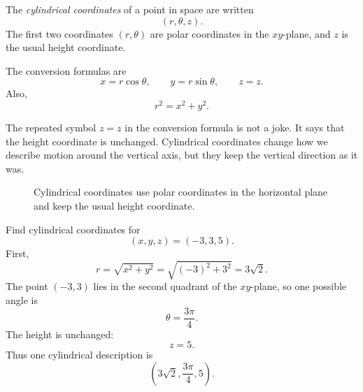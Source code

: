 \begin{definition}
The \emph{cylindrical coordinates} of a point in space are written
\[
    (r,\theta,z).
\]
The first two coordinates \((r,\theta)\) are polar coordinates in the \(xy\)-plane, and
\(z\) is the usual height coordinate.

The conversion formulas are
\[
\boxed{
    x=r\cos\theta,\qquad y=r\sin\theta,\qquad z=z.
}
\]
Also,
\[
\boxed{
    r^2=x^2+y^2.
}
\]
\end{definition}

The repeated symbol \(z=z\) in the conversion formula is not a joke.  It says that the
height coordinate is unchanged.  Cylindrical coordinates change how we describe motion
around the vertical axis, but they keep the vertical direction as it was.

\begin{figure}[h]
\centering
{}
\caption{Cylindrical coordinates use polar coordinates in the horizontal plane and keep
the usual height coordinate.}
\end{figure}

\begin{example}
Find cylindrical coordinates for
\[
    (x,y,z)=(-3,3,5).
\]
First,
\[
    r=\sqrt{x^2+y^2}=\sqrt{(-3)^2+3^2}=3\sqrt2.
\]
The point \((-3,3)\) lies in the second quadrant of the \(xy\)-plane, so one possible
angle is
\[
    \theta=\frac{3\pi}{4}.
\]
The height is unchanged:
\[
    z=5.
\]
Thus one cylindrical description is
\[
    \left(3\sqrt2,\frac{3\pi}{4},5\right).
\]
\end{example}

